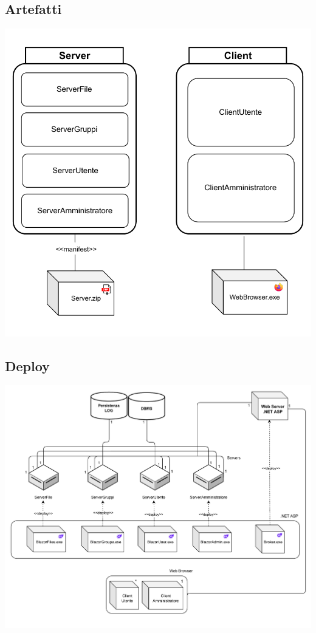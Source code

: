 \subsection*{Artefatti}
\vspace{1cm}
{}
\vspace{0.5cm}
\begin{adjustwidth}{0cm}{0cm}
\includegraphics[scale=1]{deployment/Diagramma-Sequenza-Artefatti.drawio.pdf}
\end{adjustwidth}

\vspace{1cm}
\subsection*{Deploy}
{}
\vspace{0.5cm}
\begin{adjustwidth}{-3cm}{0cm}
\includegraphics[scale=0.8]{deployment/Diagramma-Sequenza-Deploy.drawio.pdf}
\end{adjustwidth}